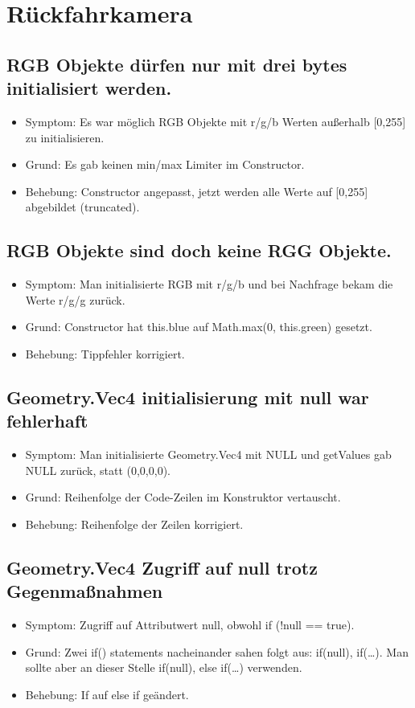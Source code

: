 \documentclass[qualitaetssicherung.tex]{subfiles}
\begin{document}
\section{Rückfahrkamera}

	\subsection{RGB Objekte dürfen nur mit drei bytes initialisiert werden.}
		\begin{itemize}
			\item
			Symptom: Es war möglich RGB Objekte mit r/g/b Werten außerhalb [0,255] zu initialisieren.
			\item
			Grund: Es gab keinen min/max Limiter im Constructor.
			\item
			Behebung: Constructor angepasst, jetzt werden alle Werte auf [0,255] abgebildet (truncated).
		\end{itemize}
		
	\subsection{RGB Objekte sind doch keine RGG Objekte.}
		\begin{itemize}
			\item
			Symptom: Man initialisierte RGB mit r/g/b und bei Nachfrage bekam die Werte r/g/g zurück.
			\item
			Grund: Constructor hat this.blue auf Math.max(0, this.green) gesetzt.
			\item
			Behebung: Tippfehler korrigiert.
		\end{itemize}
	\subsection{Geometry.Vec4 initialisierung mit null war fehlerhaft}
		\begin{itemize}
			\item
			Symptom: Man initialisierte Geometry.Vec4 mit NULL und getValues gab NULL zurück, statt (0,0,0,0).
			\item
			Grund: Reihenfolge der Code-Zeilen im Konstruktor vertauscht.
			\item
			Behebung: Reihenfolge der Zeilen korrigiert.
		\end{itemize}
	\subsection{Geometry.Vec4 Zugriff auf null trotz Gegenmaßnahmen}
		\begin{itemize}
			\item
			Symptom: Zugriff auf Attributwert null, obwohl if (!null == true).
			\item
			Grund: Zwei if() statements nacheinander sahen folgt aus: if(null), if(…). Man sollte aber an dieser Stelle if(null), else if(…) verwenden.
			\item
			Behebung: If auf else if geändert.
		\end{itemize}
\end{document}

